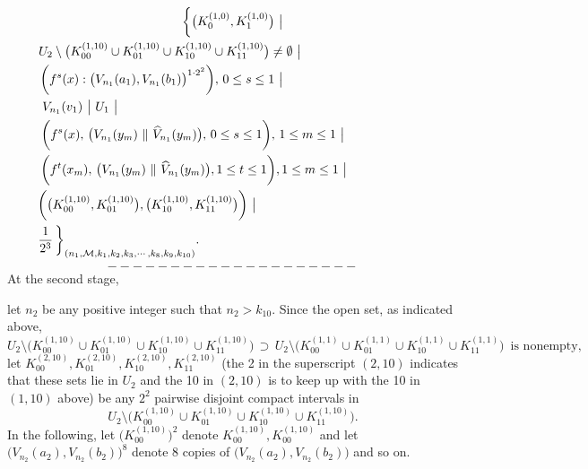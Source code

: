 \documentclass[12pt]{article}
\begin{document}
\begin{multline*}
$$
\bigg\{ \big(K_0^{(1,0)}, K_1^{(1,0)}\big) \,\, \big| \\
\,\, U_2 \setminus \big(K_{00}^{(1,10)} \cup K_{01}^{(1,10)} \cup K_{10}^{(1,10)} \cup K_{11}^{(1,10)} \big) \ne \emptyset \,\, \big| \qquad\qquad\qquad\qquad\qquad\,\, \\ 
\,\,\,\, \bigg(f^s(x):\big(V_{n_1}(a_1), V_{n_1}(b_1)\big)^{1 \cdot 2^2}\bigg), \, 0 \le s \le 1 \,\, \big| \qquad\qquad\qquad\qquad\qquad\qquad \\
\,\, V_{n_1}(v_1) \,\, \big| \,\, U_1 \,\, \big|  \qquad\qquad\qquad\qquad\qquad\qquad\qquad\qquad\qquad\qquad\qquad\quad\quad\,\,\,\, \\
\bigg(f^{s}(x), \, \big(V_{n_1}(y_m) \,\, \| \,\, \widehat V_{n_1}(y_m)\big), \, 0 \le s \le 1\bigg), \, 1 \le m \le 1 \,\, \big| \qquad\qquad\quad\quad\,\, \\ 
\qquad \bigg(f^t(x_m), \, \big(V_{n_1}(y_m) \,\, \| \,\, \widehat V_{n_1}(y_m)\big), 1 \le t \le 1\bigg), 1 \le m \le 1 \,\, \big| \qquad\qquad\qquad\qquad\, \\ 
\bigg(\big(K_{00}^{(1,10)}, K_{01}^{(1,10)}\big), \big(K_{10}^{(1,10)}, K_{11}^{(1,10)}\big)\bigg) \,\, \big| \qquad\qquad\qquad\qquad\qquad\qquad\quad\,\,\,\, \\
\,\, \frac 1{2^3}  \, \bigg\}_{(n_1, \mathcal M, k_1, k_2, k_3, \cdots, k_8, k_9, k_{10})}. \qquad\qquad\qquad\qquad\qquad\qquad\qquad\qquad\qquad\,\,\,
$$
\end{multline*}
$$--------------------$$
\indent At the second stage, 

let $n_2$ be any positive integer such that $n_2 > k_{10}$.  Since the open set, as indicated above,
$$
U_2 \setminus \big(K_{00}^{(1,10)} \cup K_{01}^{(1,10)} \cup K_{10}^{(1,10)} \cup K_{11}^{(1,10)}\big) \, \supset \, U_2 \setminus \big(K_{00}^{(1,1)} \cup K_{01}^{(1,1)} \cup K_{10}^{(1,1)} \cup K_{11}^{(1,1)}\big) \,\,\, \text{is nonempty},
$$
let $K_{00}^{(2,10)}, K_{01}^{(2,10)}, K_{10}^{(2,10)}, K_{11}^{(2,10)}$ \big(the 2 in the superscript $(2, 10)$ indicates that these sets lie in $U_2$ and the 10 in $(2, 10)$ is to keep up with the 10 in $(1, 10)$ above\big) be any $2^2$ pairwise disjoint compact intervals in 
$$
U_2 \setminus \big( K_{00}^{(1,10)} \cup K_{01}^{(1,10)} \cup K_{10}^{(1,10)} \cup K_{11}^{(1,10)}\big).
$$
\indent In the following, let $\big(K_{00}^{(1,10)}\big)^2$ denote $K_{00}^{(1,10)}, K_{00}^{(1,10)}$ and let $\big(V_{n_2}(a_2), V_{n_2}(b_2)\big)^8$ denote 8 copies of $\big(V_{n_2}(a_2), V_{n_2}(b_2)\big)$ and so on.  
\end{document}
